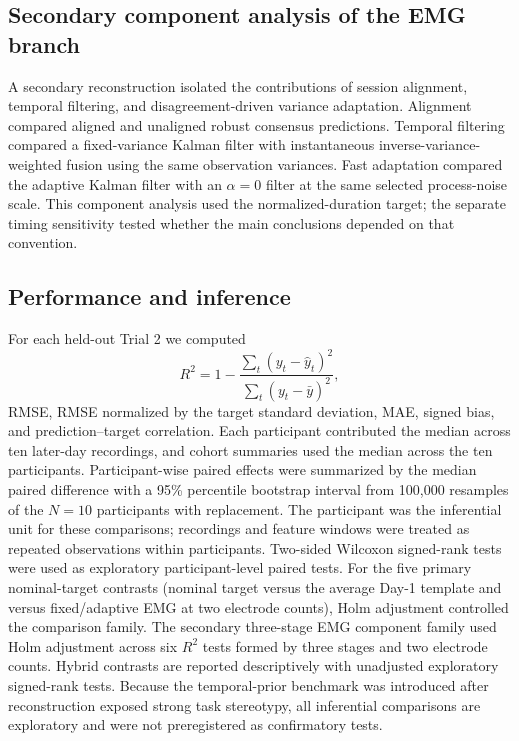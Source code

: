 \documentclass[preprint,12pt]{elsarticle}
\begin{document}
\subsection{Secondary component analysis of the EMG branch}

A secondary reconstruction isolated the contributions of session alignment, temporal filtering, and disagreement-driven variance adaptation. Alignment compared aligned and unaligned robust consensus predictions. Temporal filtering compared a fixed-variance Kalman filter with instantaneous inverse-variance-weighted fusion using the same observation variances. Fast adaptation compared the adaptive Kalman filter with an $\alpha=0$ filter at the same selected process-noise scale. This component analysis used the normalized-duration target; the separate timing sensitivity tested whether the main conclusions depended on that convention.

\subsection{Performance and inference}

For each held-out Trial 2 we computed
\begin{equation}
R^2=1-\frac{\sum_t(y_t-\hat y_t)^2}{\sum_t(y_t-\bar y)^2},
\end{equation}
RMSE, RMSE normalized by the target standard deviation, MAE, signed bias, and prediction--target correlation. Each participant contributed the median across ten later-day recordings, and cohort summaries used the median across the ten participants. Participant-wise paired effects were summarized by the median paired difference with a 95\% percentile bootstrap interval from 100,000 resamples of the $N=10$ participants with replacement. The participant was the inferential unit for these comparisons; recordings and feature windows were treated as repeated observations within participants. Two-sided Wilcoxon signed-rank tests were used as exploratory participant-level paired tests. For the five primary nominal-target contrasts (nominal target versus the average Day-1 template and versus fixed/adaptive EMG at two electrode counts), Holm adjustment controlled the comparison family. The secondary three-stage EMG component family used Holm adjustment across six $R^2$ tests formed by three stages and two electrode counts. Hybrid contrasts are reported descriptively with unadjusted exploratory signed-rank tests. Because the temporal-prior benchmark was introduced after reconstruction exposed strong task stereotypy, all inferential comparisons are exploratory and were not preregistered as confirmatory tests.
\end{document}
